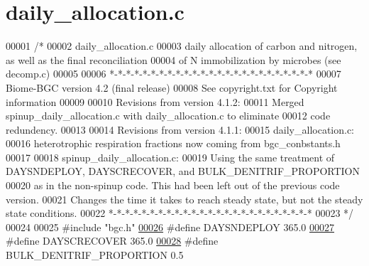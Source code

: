 \hypertarget{daily__allocation_8c_source}{}\section{daily\+\_\+allocation.\+c}
\label{daily__allocation_8c_source}

\begin{DoxyCode}
00001 \textcolor{comment}{/* }
00002 \textcolor{comment}{daily\_allocation.c}
00003 \textcolor{comment}{daily allocation of carbon and nitrogen, as well as the final reconciliation}
00004 \textcolor{comment}{of N immobilization by microbes (see decomp.c)}
00005 \textcolor{comment}{}
00006 \textcolor{comment}{*-*-*-*-*-*-*-*-*-*-*-*-*-*-*-*-*-*-*-*-*-*-*-*-*}
00007 \textcolor{comment}{Biome-BGC version 4.2 (final release)}
00008 \textcolor{comment}{See copyright.txt for Copyright information}
00009 \textcolor{comment}{}
00010 \textcolor{comment}{Revisions from version 4.1.2:}
00011 \textcolor{comment}{    Merged spinup\_daily\_allocation.c with daily\_allocation.c to eliminate }
00012 \textcolor{comment}{    code redundency.}
00013 \textcolor{comment}{}
00014 \textcolor{comment}{Revisions from version 4.1.1:}
00015 \textcolor{comment}{    daily\_allocation.c:}
00016 \textcolor{comment}{    heterotrophic respiration fractions now coming from bgc\_conbstants.h}
00017 \textcolor{comment}{}
00018 \textcolor{comment}{    spinup\_daily\_allocation.c:}
00019 \textcolor{comment}{    Using the same treatment of DAYSNDEPLOY, DAYSCRECOVER, and BULK\_DENITRIF\_PROPORTION}
00020 \textcolor{comment}{    as in the non-spinup code.  This had been left out of the previous code version.}
00021 \textcolor{comment}{    Changes the time it takes to reach steady state, but not the steady state conditions.}
00022 \textcolor{comment}{*-*-*-*-*-*-*-*-*-*-*-*-*-*-*-*-*-*-*-*-*-*-*-*-*}
00023 \textcolor{comment}{*/}
00024 
00025 \textcolor{preprocessor}{#include "bgc.h"}
\hypertarget{daily__allocation_8c_source_l00026}{}\hyperlink{daily__allocation_8c_aea9c7b118244ce7b3ee8a566854ad3d8}{00026} \textcolor{preprocessor}{#define DAYSNDEPLOY 365.0}
\hypertarget{daily__allocation_8c_source_l00027}{}\hyperlink{daily__allocation_8c_adb2b35cde4b81275d96f50e4dc6714f5}{00027} \textcolor{preprocessor}{#define DAYSCRECOVER 365.0}
\hypertarget{daily__allocation_8c_source_l00028}{}\hyperlink{daily__allocation_8c_a4c8a08fb632dd0b90b193f4f679a3f3f}{00028} \textcolor{preprocessor}{#define BULK\_DENITRIF\_PROPORTION 0.5}

\end{DoxyCode}
